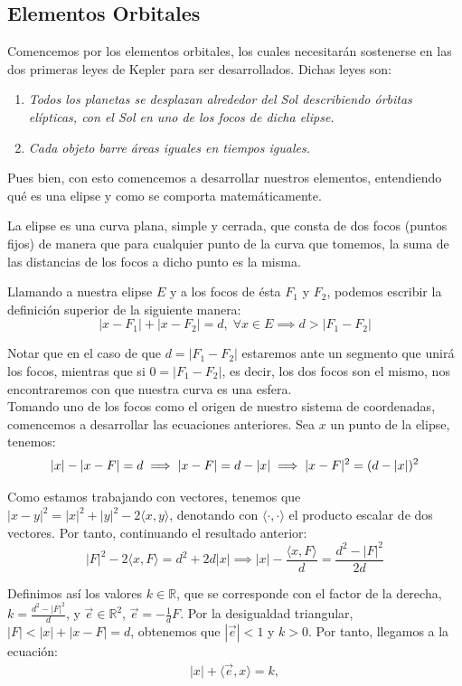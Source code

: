 \subsection{Elementos Orbitales}
\label{subsec:orbital_elements}
Comencemos por los elementos orbitales, los cuales necesitarán sostenerse en las dos primeras leyes de Kepler para ser desarrollados. Dichas leyes son:

\begin{enumerate}
\item \textit{Todos los planetas se desplazan alrededor del Sol describiendo órbitas elípticas, con el Sol en uno de los focos de dicha elipse.}
\item \textit{Cada objeto barre áreas iguales en tiempos iguales.}
\end{enumerate}

Pues bien, con esto comencemos a desarrollar nuestros elementos, entendiendo qué es una elipse y como se comporta matemáticamente.
\begin{definition}
La elipse es una curva plana, simple y cerrada, que consta de dos focos (puntos fijos) de manera que para cualquier punto de la curva que tomemos, la suma de las distancias de los focos a dicho punto es la misma. \cite{ortega}
\end{definition}

Llamando a nuestra elipse $E$ y a los focos de ésta $F_1$ y $F_2$, podemos escribir la definición superior de la siguiente manera:
\[
|x-F_1|+|x-F_2|=d, \; \forall x \in E \implies d>|F_1-F_2|
\]

Notar que en el caso de que $d=|F_1-F_2|$ estaremos ante un segmento que unirá los focos, mientras que si $0=|F_1-F_2|$, es decir, los dos focos son el mismo, nos encontraremos con que nuestra curva es una esfera.\\

Tomando uno de los focos como el origen de nuestro sistema de coordenadas, comencemos a desarrollar las ecuaciones anteriores. Sea $x$ un punto de la elipse, tenemos:
\[
|x|-|x-F|=d \implies |x-F|=d-|x| \implies |x-F|^2=(d-|x|)^2\\
\]

Como estamos trabajando con vectores, tenemos que $|x-y|^2=|x|^2+|y|^2-2\langle x,y\rangle$, denotando con $\langle\cdot,\cdot\rangle$ el producto escalar de dos vectores. Por tanto, continuando el resultado anterior:
\[
|F|^2-2\langle x,F\rangle=d^2+2d|x| \implies |x|-\frac{\langle x,F\rangle}{d}=\frac{d^2-|F|^2}{2d}
\]

Definimos así los valores $k\in\mathbb{R}$, que se corresponde con el factor de la derecha, $k=\frac{d^2-|F|^2}{d}$, y $\vec{e}\in\mathbb{R}^2$, $\vec{e}=-\frac{1}{d}F$. Por la desigualdad triangular, $|F|<|x|+|x-F|=d$, obtenemos que $|\vec{e}|<1$ y $k>0$. Por tanto, llegamos a la ecuación:
\begin{align}
|x|+\langle \vec{e},x\rangle=k,
\label{eq:elipse_cartesiana}
\end{align}

